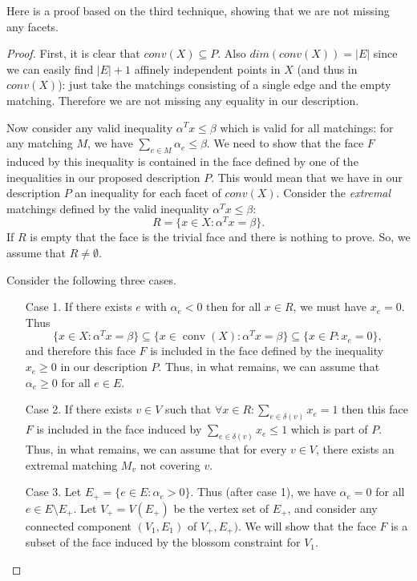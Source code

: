 \documentclass[12pt]{article}
\newcommand{\conv}{\operatorname{conv}}
\begin{document}
  Here is a proof based on the third technique, showing that we are not missing any facets. 
\begin{proof}
First, it is clear that $conv(X)\subseteq P$. Also $dim(conv(X))=|E|$ since we can easily find $|E|+1$ affinely independent points in $X$ (and thus in $conv(X)$): just take the matchings consisting of a single edge and the empty matching. 
Therefore we are not missing any equality in our description. 

Now consider any valid inequality $\alpha^T x\leq \beta$ which is valid for all matchings: for any matching $M$, we have $\sum_{e\in M} \alpha_e \leq \beta$. We need to show that the face $F$ induced by this inequality is contained in the face defined by one of the inequalities in our proposed description $P$. This would mean that we have in our description $P$ an inequality for each facet of $conv(X)$. Consider the {\it extremal} matchings defined by the valid inequality $\alpha^T x\leq \beta$:
$$R=\{x\in X: \alpha^T x=\beta\}.$$ If $R$ is empty that the face is the trivial face and there is nothing to prove. So, we assume that $R\neq \emptyset$. 

Consider the following three cases. 
\begin{enumerate}
	\item[Case 1.] If there exists $e$ with $\alpha_e<0$ then for all $x\in R$, we must have $x_e=0$. Thus 
	$$\{x\in X: \alpha^T x=\beta\} \subseteq \{x\in \conv(X): \alpha^Tx=\beta\}\subseteq \{x\in P: x_e=0\},$$ and therefore this face $F$ is included in the face defined by the inequality $x_e\geq 0$ in our description $P$. Thus, in what remains, we can assume that $\alpha_e\geq 0$ for all $e\in E$. 
	\item[Case 2.] If there exists $v\in V$ such that $\forall x\in R: \sum_{e\in \delta(v)} x_e=1$ then this face $F$ is included in the face induced by $ \sum_{e\in \delta(v)} x_e \leq 1$ which is part of $P$. Thus, in what remains, we can assume that for every $v\in V$, there exists an extremal matching $M_v$ not covering $v$.
	\item[Case 3.] Let $E_+=\{e\in E: \alpha_e>0\}$. Thus (after case 1), we have $\alpha_e=0$ for all $e\in E\setminus E_+$. Let $V_+=V(E_+)$ be the vertex set of $E_+$, and consider any connected component $(V_1,E_1)$ of $V_+,E_+)$. We will show that the face $F$ is a subset of the face induced by the blossom constraint for $V_1$. 
	

\end{enumerate}
\end{proof}
\end{document}
